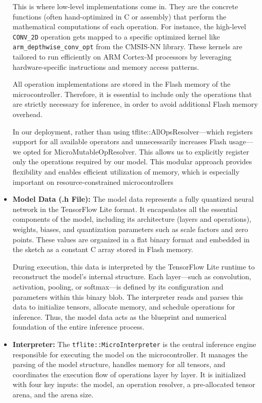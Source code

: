 \begin{itemize}
    This is where low-level implementations come in. They are the concrete functions (often hand-optimized in C or assembly) that perform the mathematical computations of each operation. For instance, the high-level \texttt{CONV\_2D} operation gets mapped to a specific optimized kernel like \texttt{arm\_depthwise\_conv\_opt} from the CMSIS-NN library. These kernels are tailored to run efficiently on ARM Cortex-M processors by leveraging hardware-specific instructions and memory access patterns.

    All operation implementations are stored in the Flash memory of the microcontroller. Therefore, it is essential to include only the operations that are strictly necessary for inference, in order to avoid additional Flash memory overhead.

    In our deployment, rather than using tflite::AllOpsResolver—which registers support for all available operators and unnecessarily increases Flash usage—we opted for MicroMutableOpResolver. This allows us to explicitly register only the operations required by our model. This modular approach provides flexibility and enables efficient utilization of memory, which is especially important on resource-constrained microcontrollers

    \clearpage
    
    \item \textbf{Model Data (.h File):} 
    The model data represents a fully quantized neural network in the TensorFlow Lite format. It encapsulates all the essential components of the model, including its architecture (layers and operations), weights, biases, and quantization parameters such as scale factors and zero points. These values are organized in a flat binary format and embedded in the sketch as a constant C array stored in Flash memory.
    
    During execution, this data is interpreted by the TensorFlow Lite runtime to reconstruct the model's internal structure. Each layer—such as convolution, activation, pooling, or softmax—is defined by its configuration and parameters within this binary blob. The interpreter reads and parses this data to initialize tensors, allocate memory, and schedule operations for inference. Thus, the model data acts as the blueprint and numerical foundation of the entire inference process.

    \item \textbf{Interpreter:} 
    The \texttt{tflite::MicroInterpreter} is the central inference engine responsible for executing the model on the microcontroller. It manages the parsing of the model structure, handles memory for all tensors, and coordinates the execution flow of operations layer by layer. It is initialized with four key inputs: the model, an operation resolver, a pre-allocated tensor arena, and the arena size.
    

\end{itemize}
